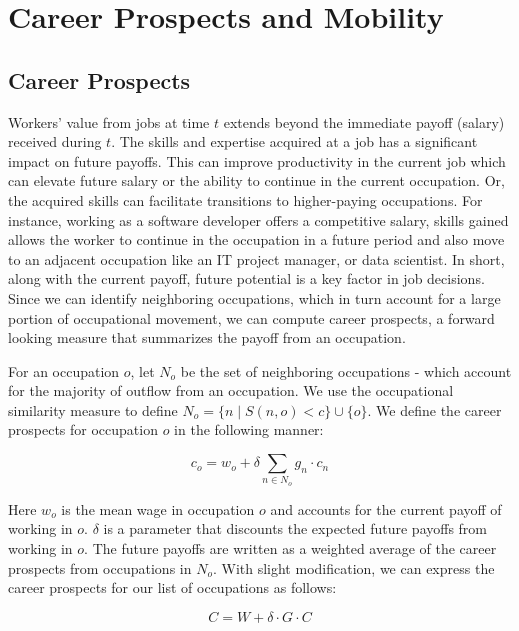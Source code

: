 \documentclass{article}
\begin{document}
\section{Career Prospects and Mobility}

\subsection{Career Prospects}

Workers' value from jobs at time $t$ extends beyond the immediate payoff (salary) received during $t$. The skills and expertise acquired at a job has a significant impact on future payoffs. This can improve productivity in the current job which can elevate future salary or the ability to continue in the current occupation. Or, the acquired skills can facilitate transitions to higher-paying occupations. For instance, working as a software developer offers a competitive salary, skills gained allows the worker to continue in the occupation in a future period and also move to an adjacent occupation like an IT project manager, or data scientist. In short, along with the current payoff, future potential is a key factor in job decisions. Since we can identify neighboring occupations, which in turn account for a large portion of occupational movement, we can compute career prospects, a forward looking measure that summarizes the payoff from an occupation. 

For an occupation $o$, let $N_o$ be the set of neighboring occupations - which account for the majority of outflow from an occupation. We use the occupational similarity measure to define $N_o = \{ n \mid S(n, o) < c \} \cup \{ o \}$. We define the career prospects for occupation $o$ in the following manner:

\begin{equation}
c_o = w_o + \delta \sum_{n \in N_o} g_n \cdot c_n
\end{equation}

Here $w_o$ is the mean wage in occupation $o$ and accounts for the current payoff of working in $o$. $\delta$ is a parameter that discounts the expected future payoffs from working in $o$. The future payoffs are written as a weighted average of the career prospects from occupations in $N_o$. With slight modification, we can express the career prospects for our list of occupations as follows:

\begin{equation}\label{eq:matrixform}
C = W + \delta \cdot G \cdot C
\end{equation}
\end{document}

